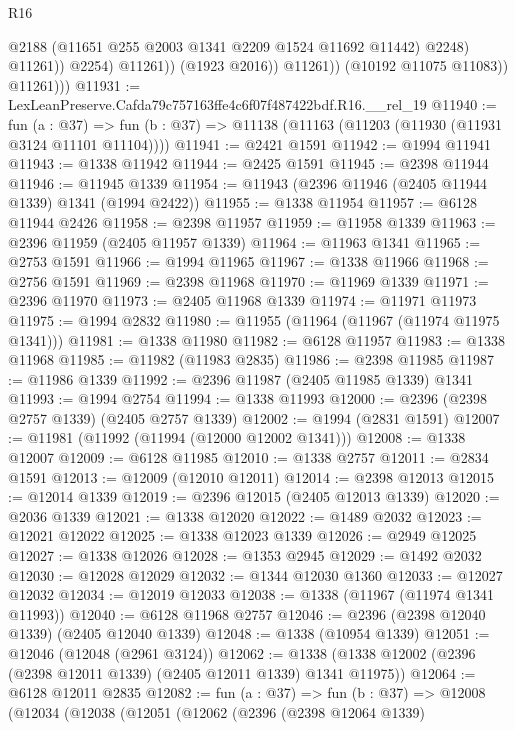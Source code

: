 \begin{lexlean}{R16}
\begin{coremodule}
                              @2188
                              (@11651 @255 @2003 @1341 @2209 @1524 @11692 @11442)
                              @2248)
                            @11261))
                        @2254)
                      @11261))
                  (@1923 @2016))
                @11261))
            (@10192 @11075 @11083))
          @11261)))
@11931 := LexLeanPreserve.Cafda79c757163ffe4c6f07f487422bdf.R16.__rel_19
@11940 := fun (a : @37) =>
  fun (b : @37) => @11138 (@11163 (@11203 (@11930 (@11931 @3124 @11101 @11104))))
@11941 := @2421 @1591
@11942 := @1994 @11941
@11943 := @1338 @11942
@11944 := @2425 @1591
@11945 := @2398 @11944
@11946 := @11945 @1339
@11954 := @11943 (@2396 @11946 (@2405 @11944 @1339) @1341 (@1994 @2422))
@11955 := @1338 @11954
@11957 := @6128 @11944 @2426
@11958 := @2398 @11957
@11959 := @11958 @1339
@11963 := @2396 @11959 (@2405 @11957 @1339)
@11964 := @11963 @1341
@11965 := @2753 @1591
@11966 := @1994 @11965
@11967 := @1338 @11966
@11968 := @2756 @1591
@11969 := @2398 @11968
@11970 := @11969 @1339
@11971 := @2396 @11970
@11973 := @2405 @11968 @1339
@11974 := @11971 @11973
@11975 := @1994 @2832
@11980 := @11955 (@11964 (@11967 (@11974 @11975 @1341)))
@11981 := @1338 @11980
@11982 := @6128 @11957
@11983 := @1338 @11968
@11985 := @11982 (@11983 @2835)
@11986 := @2398 @11985
@11987 := @11986 @1339
@11992 := @2396 @11987 (@2405 @11985 @1339) @1341
@11993 := @1994 @2754
@11994 := @1338 @11993
@12000 := @2396 (@2398 @2757 @1339) (@2405 @2757 @1339)
@12002 := @1994 (@2831 @1591)
@12007 := @11981 (@11992 (@11994 (@12000 @12002 @1341)))
@12008 := @1338 @12007
@12009 := @6128 @11985
@12010 := @1338 @2757
@12011 := @2834 @1591
@12013 := @12009 (@12010 @12011)
@12014 := @2398 @12013
@12015 := @12014 @1339
@12019 := @2396 @12015 (@2405 @12013 @1339)
@12020 := @2036 @1339
@12021 := @1338 @12020
@12022 := @1489 @2032
@12023 := @12021 @12022
@12025 := @1338 @12023 @1339
@12026 := @2949 @12025
@12027 := @1338 @12026
@12028 := @1353 @2945
@12029 := @1492 @2032
@12030 := @12028 @12029
@12032 := @1344 @12030 @1360
@12033 := @12027 @12032
@12034 := @12019 @12033
@12038 := @1338 (@11967 (@11974 @1341 @11993))
@12040 := @6128 @11968 @2757
@12046 := @2396 (@2398 @12040 @1339) (@2405 @12040 @1339)
@12048 := @1338 (@10954 @1339)
@12051 := @12046 (@12048 (@2961 @3124))
@12062 := @1338 (@1338 @12002 (@2396 (@2398 @12011 @1339) (@2405 @12011 @1339) @1341 @11975))
@12064 := @6128 @12011 @2835
@12082 := fun (a : @37) =>
  fun (b : @37) =>
  @12008
    (@12034
      (@12038
        (@12051
          (@12062
            (@2396
              (@2398 @12064 @1339)

\end{coremodule}
\end{lexlean}

